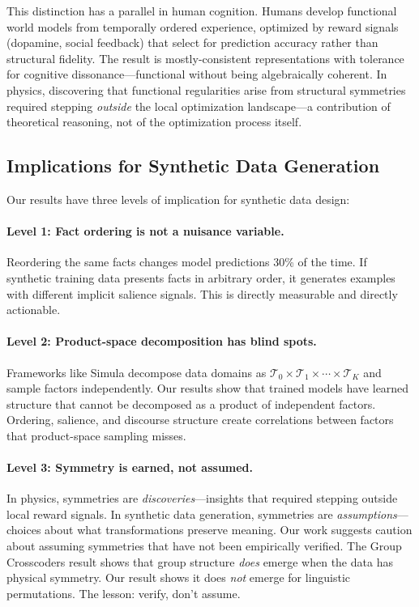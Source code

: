 \documentclass[10pt, letterpaper]{article}
\begin{document}
This distinction has a parallel in human cognition. Humans develop functional world models from temporally ordered experience, optimized by reward signals (dopamine, social feedback) that select for prediction accuracy rather than structural fidelity. The result is mostly-consistent representations with tolerance for cognitive dissonance---functional without being algebraically coherent. In physics, discovering that functional regularities arise from structural symmetries required stepping \emph{outside} the local optimization landscape---a contribution of theoretical reasoning, not of the optimization process itself.

\subsection{Implications for Synthetic Data Generation}

Our results have three levels of implication for synthetic data design:

\paragraph{Level 1: Fact ordering is not a nuisance variable.} Reordering the same facts changes model predictions 30\% of the time. If synthetic training data presents facts in arbitrary order, it generates examples with different implicit salience signals. This is directly measurable and directly actionable.

\paragraph{Level 2: Product-space decomposition has blind spots.} Frameworks like Simula \cite{davidson2026simula} decompose data domains as $\mathcal{T}_0 \times \mathcal{T}_1 \times \cdots \times \mathcal{T}_K$ and sample factors independently. Our results show that trained models have learned structure that cannot be decomposed as a product of independent factors. Ordering, salience, and discourse structure create correlations between factors that product-space sampling misses.

\paragraph{Level 3: Symmetry is earned, not assumed.} In physics, symmetries are \emph{discoveries}---insights that required stepping outside local reward signals. In synthetic data generation, symmetries are \emph{assumptions}---choices about what transformations preserve meaning. Our work suggests caution about assuming symmetries that have not been empirically verified. The Group Crosscoders result shows that group structure \emph{does} emerge when the data has physical symmetry. Our result shows it does \emph{not} emerge for linguistic permutations. The lesson: verify, don't assume.
\end{document}
